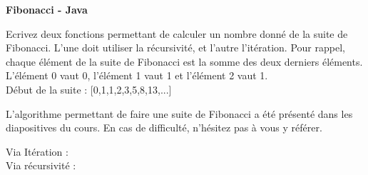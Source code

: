         \begin{Exercice}[15 minutes] \textbf{Fibonacci - Java} 
        
        Ecrivez deux fonctions permettant de calculer un nombre donné de la suite de Fibonacci. L'une doit utiliser la récursivité, et l'autre l'itération. Pour rappel, chaque élément de la suite de Fibonacci est la somme des deux derniers éléments. L'élément 0 vaut 0, l'élément 1 vaut 1 et l'élément 2 vaut 1. \\
        
        Début de la suite : [0,1,1,2,3,5,8,13,...]
          
        
            \begin{conseil} 
                L'algorithme permettant de faire une suite de Fibonacci a été présenté dans les diapositives du cours. En cas de difficulté, n'hésitez pas à vous y référer.
            \end{conseil} 
        
            \begin{solution}
                Via Itération : \\
                
                     
                    
                Via récursivité : \\
                
                    
            \end{solution} 
        
        \end{Exercice}
        
        

